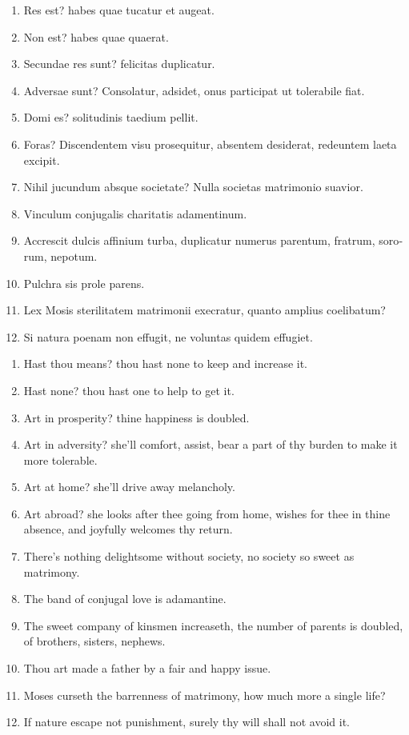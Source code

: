 \begin{latin}
\begin{enumerate}
\item Res est? habes quae tucatur et augeat.
\item Non est? habes quae quaerat.
\item Secundae res sunt? felicitas duplicatur.
\item Adversae sunt? Consolatur, adsidet, onus participat ut tolerabile fiat.
\item Domi es? solitudinis taedium pellit.
\item Foras? Discendentem visu prosequitur, absentem desiderat, redeuntem laeta excipit.
\item Nihil jucundum absque societate? Nulla societas matrimonio suavior.
\item Vinculum conjugalis charitatis adamentinum.
\item Accrescit dulcis affinium turba, duplicatur numerus parentum, fratrum, sororum, nepotum.
\item Pulchra sis prole parens.
\item Lex Mosis sterilitatem matrimonii execratur, quanto amplius coelibatum?
\item Si natura poenam non effugit, ne voluntas quidem effugiet.
\end{enumerate}
\end{latin}%
\translationrule%
\begin{displayquote}%
\begin{enumerate}
  \item Hast thou means? thou hast none to keep and increase it.
  \item Hast none? thou hast one to help to get it.
  \item Art in prosperity? thine happiness is doubled.
  \item Art in adversity? she'll comfort, assist, bear a part of thy burden to make it more tolerable.
  \item Art at home? she'll drive away melancholy.
  \item Art abroad? she looks after thee going from home, wishes for thee in thine absence, and joyfully welcomes thy return.
  \item There's nothing delightsome without society, no society so sweet as matrimony.
  \item The band of conjugal love is adamantine.
  \item The sweet company of kinsmen increaseth, the number of parents is doubled, of brothers, sisters, nephews.
  \item Thou art made a father by a fair and happy issue.
  \item Moses curseth the barrenness of matrimony, how much more a single life?
  \item If nature escape not punishment, surely thy will shall not avoid it.
\end{enumerate}
\end{displayquote}

